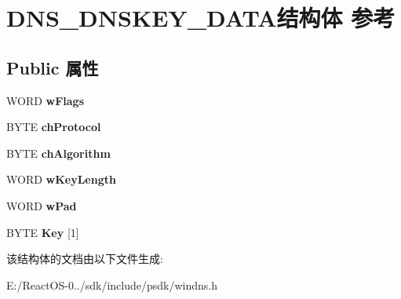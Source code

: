 \hypertarget{struct_d_n_s___d_n_s_k_e_y___d_a_t_a}{}\section{D\+N\+S\+\_\+\+D\+N\+S\+K\+E\+Y\+\_\+\+D\+A\+T\+A结构体 参考}
\label{struct_d_n_s___d_n_s_k_e_y___d_a_t_a}
\subsection*{Public 属性}
\begin{DoxyCompactItemize}
\item 
\mbox{\label{struct_d_n_s___d_n_s_k_e_y___d_a_t_a_afe7eb23841cb9259fe9243c71917180a}} 
W\+O\+RD {\bfseries w\+Flags}
\item 
\mbox{\label{struct_d_n_s___d_n_s_k_e_y___d_a_t_a_ac67a3ee41ceb17ad6a6d0d3793a49eff}} 
B\+Y\+TE {\bfseries ch\+Protocol}
\item 
\mbox{\label{struct_d_n_s___d_n_s_k_e_y___d_a_t_a_a759f982d43548aafc76a90800e80e0b2}} 
B\+Y\+TE {\bfseries ch\+Algorithm}
\item 
\mbox{\label{struct_d_n_s___d_n_s_k_e_y___d_a_t_a_a0846f683d930735037aa0ca6467ec4e7}} 
W\+O\+RD {\bfseries w\+Key\+Length}
\item 
\mbox{\label{struct_d_n_s___d_n_s_k_e_y___d_a_t_a_a557b42825dcfdee9392ae0db491038b5}} 
W\+O\+RD {\bfseries w\+Pad}
\item 
\mbox{\label{struct_d_n_s___d_n_s_k_e_y___d_a_t_a_a6eaaef468a0e903c239462e5261c4986}} 
B\+Y\+TE {\bfseries Key} \mbox{[}1\mbox{]}
\end{DoxyCompactItemize}


该结构体的文档由以下文件生成\+:\begin{DoxyCompactItemize}
\item 
E\+:/\+React\+O\+S-\/0../sdk/include/psdk/windns.\+h\end{DoxyCompactItemize}
